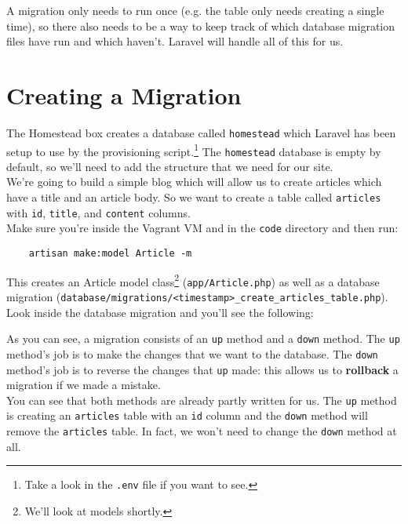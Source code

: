 A migration only needs to run once (e.g. the table only needs creating a single time), so there also needs to be a way to keep track of which database migration files have run and which haven't. Laravel will handle all of this for us.



\section{Creating a Migration}

The Homestead box creates a database called \texttt{homestead} which Laravel has been setup to use by the provisioning script.\footnote{Take a look in the \texttt{.env} file if you want to see.} The \texttt{homestead} database is empty by default, so we'll need to add the structure that we need for our site.
\\

We're going to build a simple blog which will allow us to create articles which have a title and an article body. So we want to create a table called \texttt{articles} with \texttt{id}, \texttt{title}, and \texttt{content} columns.
\\

Make sure you're inside the Vagrant VM and in the \texttt{code} directory and then run:

\begin{verbatim}
    artisan make:model Article -m
\end{verbatim}

This creates an Article model class\footnote{We'll look at models shortly.} (\texttt{app/Article.php}) as well as a database migration (\texttt{database/migrations/<timestamp>\_create\_articles\_table.php}).
\\

Look inside the database migration and you'll see the following:


As you can see, a migration consists of an \texttt{up} method and a \texttt{down} method. The \texttt{up} method's job is to make the changes that we want to the database. The \texttt{down} method's job is to reverse the changes that \texttt{up} made: this allows us to \textbf{rollback} a migration if we made a mistake.
\\

You can see that both methods are already partly written for us. The \texttt{up} method is creating an \texttt{articles} table with an \texttt{id} column and the \texttt{down} method will remove the \texttt{articles} table. In fact, we won't need to change the \texttt{down} method at all.


